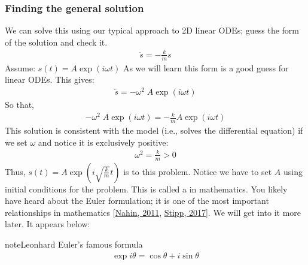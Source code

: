 \documentclass[letterpaper,10pt,english]{jupyterBook}
\begin{document}
\subsubsection{Finding the general solution}
\label{\detokenize{content/2_oscillations/readings-SHO-intro:finding-the-general-solution}}
\sphinxAtStartPar
We can solve this using our typical approach to 2D linear ODEs; guess the form of the solution and check it.
\begin{equation*}
\begin{split}\ddot{s} = -\frac{k}{m}s\end{split}
\end{equation*}
\sphinxAtStartPar
Assume: \(s(t) = A\exp(i\omega t)\) As we will learn this form is a good guess for linear ODEs. This gives:
\begin{equation*}
\begin{split}\ddot{s} = -\omega^2\;A\exp(i\omega t)\end{split}
\end{equation*}
\sphinxAtStartPar
So that,
\begin{equation*}
\begin{split}-\omega^2\;A\exp(i\omega t) = -\frac{k}{m}A\exp(i\omega t)\end{split}
\end{equation*}
\sphinxAtStartPar
This solution is consistent with the model (i.e., solves the differential equation) if we set \(\omega\) and notice it is exclusively positive:
\begin{equation*}
\begin{split}\omega^2 = \frac{k}{m} > 0\end{split}
\end{equation*}
\sphinxAtStartPar
Thus, \(s(t) = A\exp(i\sqrt{\frac{k}{m}} t)\) is  to this problem. Notice we have to set \(A\) using initial conditions for the problem. This is called a  in mathematics. You likely have heard about the Euler formulation; it is one of the most important relationships in mathematics {[}\hyperlink{cite.content/X_additional_pages/references-page:id2}{Nahin, 2011}, \hyperlink{cite.content/X_additional_pages/references-page:id3}{Stipp, 2017}{]}. We will get into it more later. It appears below:

\begin{sphinxadmonition}{note}{Leonhard Euler’s famous formula}
\begin{equation*}
\begin{split}\exp{i\theta} = \cos{\theta} + i \sin{\theta}\end{split}
\end{equation*}\end{sphinxadmonition}
\end{document}
